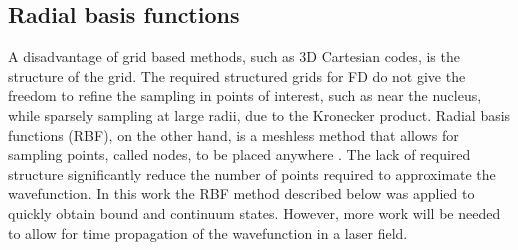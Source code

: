 \subsection{Radial basis functions} %
\label{sub:radial_basis_functions}
A disadvantage of grid based methods, such as 3D Cartesian codes, is the structure of the grid. The required structured grids for FD do not give the freedom to refine the sampling in points of interest, such as near the nucleus, while sparsely sampling at large radii, due to the Kronecker product. Radial basis functions (RBF), on the other hand, is a meshless method that allows for sampling points, called nodes, to be placed anywhere \cite{FornbergRBF}. The lack of required structure significantly reduce the number of points required to approximate the wavefunction. In this work the RBF method described below was applied to quickly obtain bound and continuum states. However, more work will be needed to allow for time propagation of the wavefunction in a laser field. 

